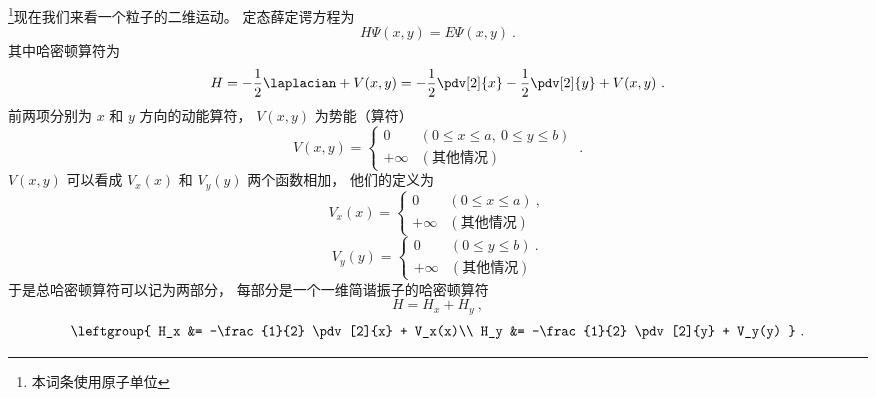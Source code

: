 

\footnote{本词条使用原子单位}现在我们来看一个粒子的二维运动。 定态薛定谔方程为
\begin{equation}\label{eq_ISW2D_1}
H \Psi(x, y) = E \Psi(x, y)~.
\end{equation}
其中哈密顿算符为
\begin{equation}
H = -\frac{1}{2} \laplacian + V(x, y) =  -\frac{1}{2} \pdv[2]{x} -\frac{1}{2} \pdv[2]{y}  + V(x, y)~.
\end{equation}
前两项分别为 $x$ 和 $y$ 方向的动能算符， $V(x, y)$ 为势能（算符）
\begin{equation}
V(x, y) =
\begin{cases}
0  & (0 \leqslant x \leqslant a,\: 0 \leqslant y \leqslant b)\\
+\infty & (\text{其他情况})
\end{cases}~.
\end{equation}
$V(x, y)$ 可以看成 $V_x(x)$ 和 $V_y(y)$ 两个函数相加， 他们的定义为
\begin{equation}
V_x(x) =
\begin{cases}
0  & (0 \leqslant x \leqslant a)~,\\
+\infty & (\text{其他情况})
\end{cases}
\end{equation}
\begin{equation}
V_y(y) =
\begin{cases}
0  & (0 \leqslant y \leqslant b)~.\\
+\infty & (\text{其他情况})
\end{cases}
\end{equation}
于是总哈密顿算符可以记为两部分， 每部分是一个一维简谐振子的哈密顿算符
\begin{equation}
H = H_x + H_y~,
\end{equation}
\begin{equation}
\leftgroup{
H_x &= -\frac{1}{2} \pdv[2]{x} + V_x(x)\\
H_y &= -\frac{1}{2} \pdv[2]{y} + V_y(y)
}~.
\end{equation}

